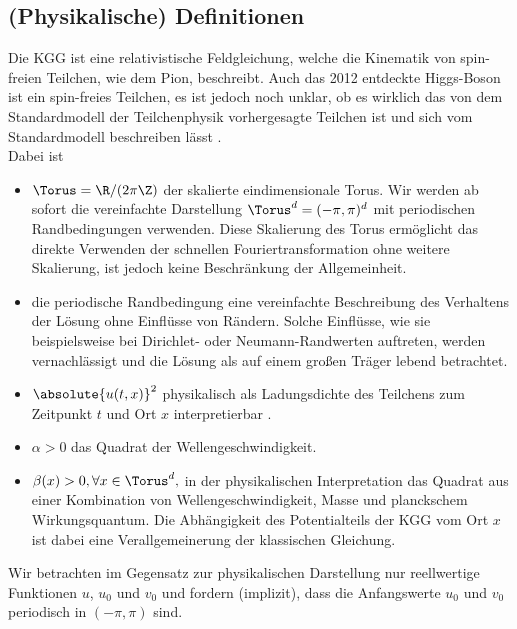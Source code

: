 \subsection{(Physikalische) Definitionen}
Die KGG ist eine relativistische Feldgleichung, welche die Kinematik von spin-freien Teilchen, wie dem Pion, beschreibt. Auch das 2012 entdeckte Higgs-Boson ist ein spin-freies Teilchen, es ist jedoch noch unklar, ob es wirklich das von dem Standardmodell der Teilchenphysik vorhergesagte Teilchen ist und sich vom Standardmodell beschreiben lässt \autocite{cern2016}.\\
Dabei ist
\begin{itemize}
\item $\Torus=\R/(2\pi\Z)$ der skalierte eindimensionale Torus. Wir werden ab sofort die vereinfachte Darstellung $\Torus^d=(-\pi,\pi)^d$ mit periodischen Randbedingungen verwenden. Diese Skalierung des Torus ermöglicht das direkte Verwenden der schnellen Fouriertransformation ohne weitere Skalierung, ist jedoch keine Beschränkung der Allgemeinheit. 
\item die periodische Randbedingung eine vereinfachte Beschreibung des Verhaltens der Lösung ohne Einflüsse von Rändern. Solche Einflüsse, wie sie beispielsweise bei Dirichlet- oder Neumann-Randwerten auftreten, werden vernachlässigt und die Lösung als auf einem großen Träger lebend betrachtet.
\item $\absolute{u(t,x)}^2$ physikalisch als Ladungsdichte des Teilchens zum Zeitpunkt $t$ und Ort $x$ interpretierbar \autocite{kleingordon2016}. 
\item $\alpha>0$ das Quadrat der Wellengeschwindigkeit.
\item $\beta(x)>0, \forall x\in \Torus^d,$ in der physikalischen Interpretation das Quadrat aus einer Kombination von Wellengeschwindigkeit, Masse und planckschem Wirkungsquantum. Die Abhängigkeit des Potentialteils der KGG vom Ort $x$ ist dabei eine Verallgemeinerung der klassischen Gleichung.
\end{itemize}
Wir betrachten im Gegensatz zur physikalischen Darstellung nur reellwertige Funktionen $u$, $u_0$ und $v_0$ und fordern (implizit), dass die Anfangswerte $u_0$ und $v_0$ periodisch in $(-\pi,\pi)$ sind. 

